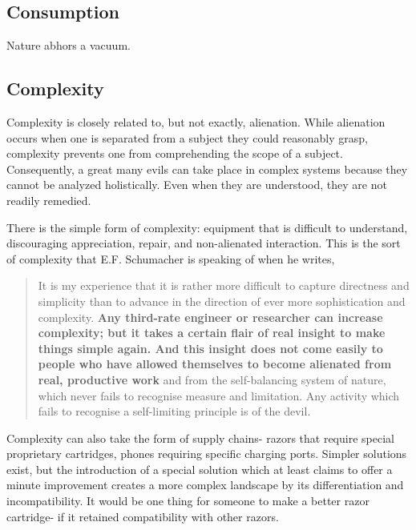 \documentclass[letterpaper]{article}
\begin{document}
\subsection{Consumption}

Nature abhors a vacuum. 

\hfill

\hfill

\hfill

\hfill

\subsection{Complexity}

Complexity is closely related to, but not exactly, alienation. While alienation occurs when one is separated from a subject they could reasonably grasp, complexity prevents one from comprehending the scope of a subject. Consequently, a great many evils can take place in complex systems because they cannot be analyzed holistically. Even when they are understood, they are not readily remedied.

There is the simple form of complexity: equipment that is difficult to understand, discouraging appreciation, repair, and non-alienated interaction. This is the sort of complexity that E.F. Schumacher is speaking of when he writes,

\begin{quote}
  It is my experience that it is rather more difficult to capture directness and simplicity than to advance in the direction of ever more sophistication and complexity. \textbf{Any third-rate engineer or researcher can increase complexity; but it takes a certain flair of real insight to make things simple again. And this insight does not come easily to people who have allowed themselves to become alienated from real, productive work} and from the self-balancing system of nature, which never fails to recognise measure and limitation. Any activity which fails to recognise a self-limiting principle is of the devil.
\end{quote}

Complexity can also take the form of supply chains- razors that require special proprietary cartridges, phones requiring specific charging ports. Simpler solutions exist, but the introduction of a special solution which at least claims to offer a minute improvement creates a more complex landscape by its differentiation and incompatibility. It would be one thing for someone to make a better razor cartridge- if it retained compatibility with other razors.
\end{document}
